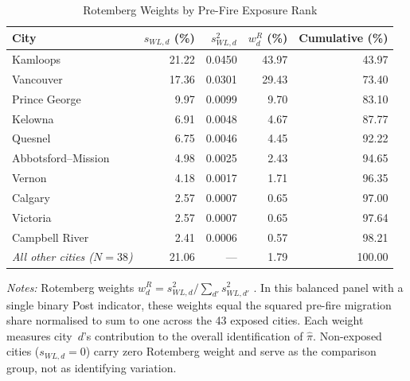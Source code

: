 \documentclass[12pt]{article}
\begin{document}
\begin{table}[!htbp]
  \caption{Rotemberg Weights by Pre-Fire Exposure Rank}
  \label{tab:rotemberg}
  \centering\small
  \begin{threeparttable}
  \begin{tabular}{lrrrr}
    \toprule
    City & $s_{WL,d}$ (\%) & $s_{WL,d}^2$ & $w_d^R$ (\%) & Cumulative (\%) \\
    \midrule
    Kamloops & 21.22 & 0.0450 & 43.97 & 43.97 \\
    Vancouver & 17.36 & 0.0301 & 29.43 & 73.40 \\
    Prince George & 9.97 & 0.0099 & 9.70 & 83.10 \\
    Kelowna & 6.91 & 0.0048 & 4.67 & 87.77 \\
    Quesnel & 6.75 & 0.0046 & 4.45 & 92.22 \\
    Abbotsford--Mission & 4.98 & 0.0025 & 2.43 & 94.65 \\
    Vernon & 4.18 & 0.0017 & 1.71 & 96.35 \\
    Calgary & 2.57 & 0.0007 & 0.65 & 97.00 \\
    Victoria & 2.57 & 0.0007 & 0.65 & 97.64 \\
    Campbell River & 2.41 & 0.0006 & 0.57 & 98.21 \\
    \addlinespace
    \textit{All other cities ($N=38$)} & 21.06 & --- & 1.79 & 100.00 \\
    \bottomrule
  \end{tabular}
  \begin{tablenotes}[flushleft]\footnotesize
    \item \textit{Notes:} Rotemberg weights $w_d^R = s_{WL,d}^2 / \sum_{d'} s_{WL,d'}^2$
      \citep{goldsmith2020}. In this balanced panel with a single binary Post indicator,
      these weights equal the squared pre-fire migration share normalised to sum to one
      across the 43 exposed cities. Each weight measures city~$d$'s contribution to the
      overall identification of $\hat{\pi}$. Non-exposed cities ($s_{WL,d}=0$) carry zero
      Rotemberg weight and serve as the comparison group, not as identifying variation.
  \end{tablenotes}
  \end{threeparttable}
\end{table}
\end{document}
